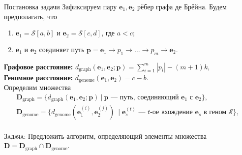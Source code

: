 \documentclass[unicode, notheorems]{beamer}
\begin{document}
\begin{frame}{Постановка задачи}
	Зафиксируем пару $\mathbf{e}_1, \mathbf{e}_2$ рёбер графа де Брёйна.
	Будем предполагать, что
	\begin{enumerate}
		\item  $\mathbf{e}_1 = \mathcal{S}[a, b]$ и $\mathbf{e}_2 = \mathcal{S}[c, d]$, где $a < c$;
		\item $\mathbf{e}_1$ и $\mathbf{e}_2$ соединяет путь $\bm p =  \mathbf{e}_1 \to p_1 \to \ldots \to p_m \to \mathbf{e}_2$.
	\end{enumerate}
	\bigskip
	{\bf Графовое расстояние:} $d_{\mathrm{graph}} (\mathbf{e}_1, \mathbf{e}_2; \bm p) = \sum_{i=1}^m |p_i| - (m+1)k$,\\
	\medskip
 	{\bf Геномное расстояние:} $d_{\mathrm{genome}}(\mathbf{e}_1, \mathbf{e}_2) = c - b$.\\
 	\bigskip
	Определим множества
	\begin{gather*}
		\mathbf{D}_{\mathrm{graph}} = \big\{ d_{\mathrm{graph}} (\mathbf{e}_1, \mathbf{e}_2; \bm p)\  |\  \bm p \text{ --- путь, соединяющий } \mathbf{e}_1 \text{ с } \mathbf{e}_2  \big\} , \\
		\mathbf{D}_{\mathrm{genome}} = \big\{  d_{\mathrm{genome}}(\mathbf{e}_1^{(i)}, \mathbf{e}_2^{(j)})\ \mid \mathbf{e}_s^{(t)} \text{ --- } t \text{-ое вхождение } \mathbf{e}_s \text{ в геном } \mathcal{S} \big\},
	\end{gather*}\\ 
	\textsc{ \large \color{blue} Задача:}
	Предложить алгоритм, определяющий  элементы множества $\mathbf{D} = \mathbf{D}_{\mathrm{graph}} \cap \mathbf{D}_{\mathrm{genome}}$.
\end{frame}
\end{document}
